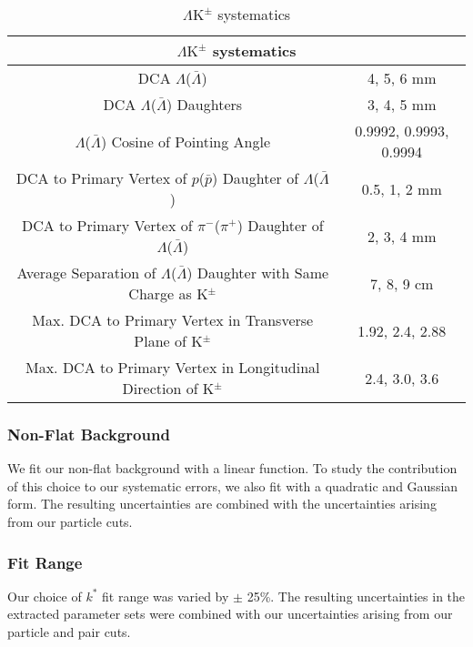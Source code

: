\documentclass[ALICE,manyauthors]{cernphprep}
\newcommand{\LamKpm}{$\Lambda\mathrm{K^{\pm}}$\xspace}
\begin{document}
\begin{table}[htbp]
 \centering 
  \renewcommand{\arraystretch}{1.2}
  \begin{tabular}{c|c}
   \multicolumn{2}{c}{\LamKpm systematics} \\
   \hline  
   DCA $\Lambda$($\bar{\Lambda}$) & 4, 5, 6 mm \\
   \hline
   DCA $\Lambda$($\bar{\Lambda}$) Daughters & 3, 4, 5 mm \\
   \hline
   $\Lambda$($\bar{\Lambda}$) Cosine of Pointing Angle & 0.9992, 0.9993, 0.9994 \\
   \hline
   DCA to Primary Vertex of $p$($\bar{p}$) Daughter of $\Lambda$($\bar{\Lambda}$) &  0.5, 1, 2 mm \\
   \hline
   DCA to Primary Vertex of $\pi^{-}$($\pi^{+}$) Daughter of $\Lambda$($\bar{\Lambda}$) &  2, 3, 4 mm  \\
   \hline
   Average Separation of $\Lambda$($\bar{\Lambda}$) Daughter with Same Charge as K$^{\pm}$ & 7, 8, 9 cm \\
   \hline
   Max. DCA to Primary Vertex in Transverse Plane of K$^{\pm}$ & 1.92, 2.4, 2.88 \\
   \hline
   Max. DCA to Primary Vertex in Longitudinal Direction of K$^{\pm}$ & 2.4, 3.0, 3.6 \\
   \hline
  \end{tabular}
 \caption{\LamKpm systematics}
 \label{tab:LamKchSystematics} 
\end{table}



\subsubsection{Non-Flat Background}
\label{SysErrsLamKch:NonFlatBgd}

We fit our non-flat background with a linear function.  To study the contribution of this choice to our systematic errors, we also fit with a quadratic and Gaussian form. The resulting uncertainties are combined with the uncertainties arising from our particle cuts.

\subsubsection{Fit Range}
\label{SysErrsLamKch:FitRange}

Our choice of $k^{*}$ fit range was varied by $\pm$ 25\%.  The resulting uncertainties in the extracted parameter sets were combined with our uncertainties arising from our particle and pair cuts.
\end{document}
